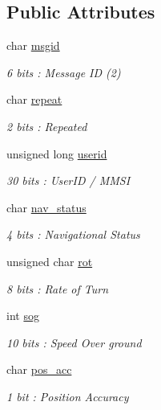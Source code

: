 \subsection*{Public Attributes}
\begin{DoxyCompactItemize}
\item 
char \mbox{\hyperlink{structaismsg__2_af2f29c63ade4e3b6d7f76ed3d587184a}{msgid}}
\begin{DoxyCompactList}\small\item\em 6 bits \+: Message ID (2) \end{DoxyCompactList}\item 
char \mbox{\hyperlink{structaismsg__2_a539fe22f6ca08acf80f7e7d86068fafc}{repeat}}
\begin{DoxyCompactList}\small\item\em 2 bits \+: Repeated \end{DoxyCompactList}\item 
unsigned long \mbox{\hyperlink{structaismsg__2_af350954bbb7c1f3918ff50da34a230ce}{userid}}
\begin{DoxyCompactList}\small\item\em 30 bits \+: User\+ID / M\+M\+SI \end{DoxyCompactList}\item 
char \mbox{\hyperlink{structaismsg__2_a84f1323553ebc2bbe2e7f0db39dac174}{nav\+\_\+status}}
\begin{DoxyCompactList}\small\item\em 4 bits \+: Navigational Status \end{DoxyCompactList}\item 
unsigned char \mbox{\hyperlink{structaismsg__2_a343923914bd8dc85cb544b982ca0ad47}{rot}}
\begin{DoxyCompactList}\small\item\em 8 bits \+: Rate of Turn \end{DoxyCompactList}\item 
int \mbox{\hyperlink{structaismsg__2_a27e640231cf46b67eadd7dacc9aa4507}{sog}}
\begin{DoxyCompactList}\small\item\em 10 bits \+: Speed Over ground \end{DoxyCompactList}\item 
char \mbox{\hyperlink{structaismsg__2_a9aaa8f557c4be30705cd08122879704b}{pos\+\_\+acc}}
\begin{DoxyCompactList}\small\item\em 1 bit \+: Position Accuracy \end{DoxyCompactList}\item 

\end{DoxyCompactItemize}
